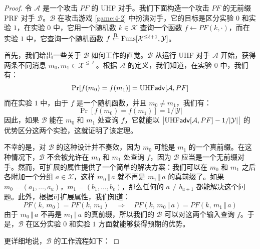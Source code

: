 \begin{proof}
令 $\mathcal{A}$ 是一个攻击 $PF$ 的 UHF 对手。我们下面构造一个攻击 $PF$ 的无前缀 PRF 对手 $\mathcal{B}$。$\mathcal{B}$ 在攻击游戏 \ref{game:4-2} 中扮演对手，它的目标是区分实验 $0$ 和实验 $1$，在实验 $0$ 中，它用一个随机数 $k\in\mathcal{K}$ 查询一个函数 $f\leftarrow PF(k,\cdot)$，而在实验 $1$ 中，它查询一个随机函数 $f\overset{\rm R}\leftarrow{\rm Funs}[\mathcal{X}^{\leq\ell+1},\mathcal{Y}]$。

首先，我们给出一些关于 $\mathcal{B}$ 如何工作的直觉。$\mathcal{B}$ 从运行 UHF 对手 $\mathcal{A}$ 开始，获得两条不同消息 $m_0,m_1\in\mathcal{X}^{\leq\ell}$。根据 $\mathcal{A}$ 的定义，我们知道，在实验 $0$ 中，我们有：
\[
\Pr[f(m_0)=f(m_1)]={\rm UHF}\mathsf{adv}[\mathcal{A},PF]
\]
而在实验 $1$ 中，由于 $f$ 是一个随机函数，并且 $m_0\neq m_1$，我们有：
\[
\Pr[f(m_0)=f(m_1)]={1}/{|\mathcal{Y}|}
\]
因此，如果 $\mathcal{B}$ 能在 $m_0$ 和 $m_1$ 处查询 $f$，它就能以 $\big\lvert{\rm UHF}\mathsf{adv}[\mathcal{A},PF]-{1}/{|\mathcal{Y}|}\big\rvert$ 的优势区分这两个实验，这就证明了该定理。

不幸的是，对 $\mathcal{B}$ 的这种设计并不奏效，因为 $m_0$ 可能是 $m_1$ 的一个真前缀。在这种情况下，$\mathcal{B}$ 不会被允许在 $m_0$ 和 $m_1$ 处查询 $f$，因为 $\mathcal{B}$ 应当是一个无前缀对手。然而，可扩展的属性提供了一个简单的解决方案：我们可以在 $m_0$ 和 $m_1$ 之后各附加一个分组 $a\in\mathcal{X}$，这样 $m_0\,\Vert\,a$ 就不再是 $m_1\,\Vert\,a$ 的真前缀了。如果 $m_0=(a_1,\dots,a_u)$，$m_1=(b_1,\dots,b_v)$，那么任何的 $a\neq b_{u+1}$ 都能解决这个问题。此外，根据可扩展属性，我们知道：
\[
PF(k,\,m_0)=PF(k,\,m_1)
\quad\Longrightarrow\quad
PF(k,\,m_0\,\Vert\,a)=PF(k,\,m_1\,\Vert\,a)
\]
由于 $m_0\,\Vert\,a$ 不再是 $m_1\,\Vert\,a$ 的真前缀，所以我们的 $\mathcal{B}$ 可以对这两个输入查询 $f$。于是，$\mathcal{B}$ 在区分实验 $0$ 和实验 $1$ 方面就能够获得预期的优势。

更详细地说，$\mathcal{B}$ 的工作流程如下：

\vspace{5pt}


\end{proof}
